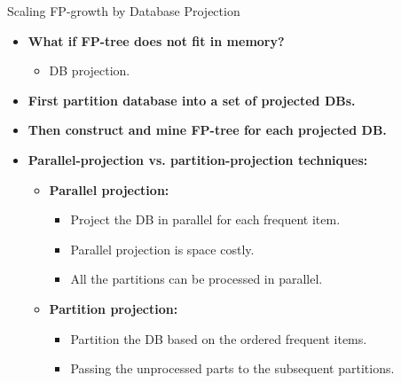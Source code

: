 \begin{frame}{Scaling FP-growth by Database Projection}
	\centering
	\begin{itemize}
		\item \textbf{What if FP-tree does not fit in memory?}
		\begin{itemize}
			\item DB projection.
		\end{itemize}
		\item \textbf{First partition database into a set of projected DBs.}
		\item \textbf{Then construct and mine FP-tree for each projected DB.}
		\item \textbf{Parallel-projection vs. partition-projection techniques:}
		\begin{itemize}
			\item \textbf{\color{airforceblue}Parallel projection:}
			\begin{itemize}
				\item Project the DB in parallel for each frequent item.
				\item Parallel projection is space costly.
				\item All the partitions can be processed in parallel.
			\end{itemize}
			\item \textbf{\color{airforceblue}Partition projection:}
			\begin{itemize}
				\item Partition the DB based on the ordered frequent items.
				\item Passing the unprocessed parts to the subsequent 
				partitions.
			\end{itemize}
		\end{itemize}
	\end{itemize}
\end{frame}

